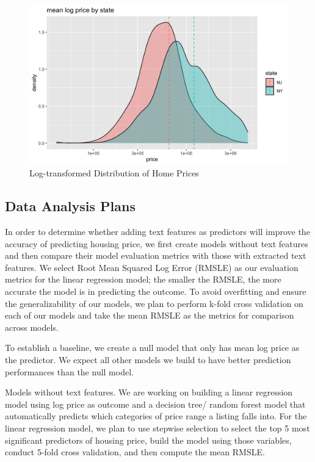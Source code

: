 \documentclass[10pt,letterpaper]{article}
\begin{document}
\begin{figure}
\includegraphics[width=0.9\linewidth]{eda} \caption{Log-transformed Distribution of Home Prices}\label{fig:unnamed-chunk-1}
\end{figure}

\hypertarget{data-analysis-plans}{%
\subsection{Data Analysis Plans}\label{data-analysis-plans}}

In order to determine whether adding text features as predictors will
improve the accuracy of predicting housing price, we first create models
without text features and then compare their model evaluation metrics
with those with extracted text features. We select Root Mean Squared Log
Error (RMSLE) as our evaluation metrics for the linear regression model;
the smaller the RMSLE, the more accurate the model is in predicting the
outcome. To avoid overfitting and ensure the generalizability of our
models, we plan to perform k-fold cross validation on each of our models
and take the mean RMSLE as the metrics for comparison across models.

To establish a baseline, we create a null model that only has mean log
price as the predictor. We expect all other models we build to have
better prediction performances than the null model.

Models without text features. We are working on building a linear
regression model using log price as outcome and a decision tree/ random
forest model that automatically predicts which categories of price range
a listing falls into. For the linear regression model, we plan to use
stepwise selection to select the top 5 most significant predictors of
housing price, build the model using those variables, conduct 5-fold
cross validation, and then compute the mean RMSLE.
\end{document}
